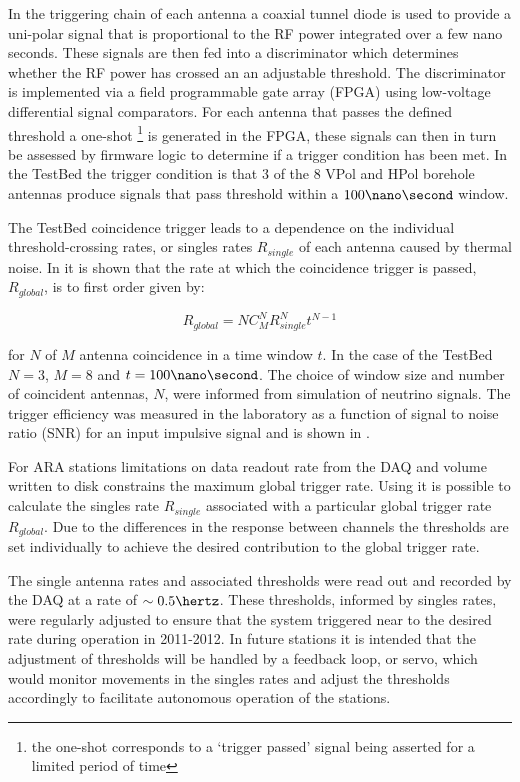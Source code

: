 In the triggering chain of each antenna a coaxial tunnel diode is used to provide a uni-polar signal that is proportional to the RF power integrated over a few nano seconds. These signals are then fed into a discriminator which determines whether the RF power has crossed an an adjustable threshold. The discriminator is implemented via a field programmable gate array (FPGA) using low-voltage differential signal comparators. For each antenna that passes the defined threshold a one-shot \footnote{the one-shot corresponds to a `trigger passed' signal being asserted for a limited period of time} is generated in the FPGA, these signals can then in turn be assessed by firmware logic to determine if a trigger condition has been met. In the TestBed the trigger condition is that 3 of the 8 VPol and HPol borehole antennas produce signals that pass threshold within a $100 \nano\second$ window. 

The TestBed coincidence trigger leads to a dependence on the individual threshold-crossing rates, or singles rates $R_{single}$ of each antenna caused by thermal noise. In  it is shown that the rate at which the coincidence trigger is passed, $R_{global}$, is to first order given by:

\begin{equation}
  R_{global} = N C^{N}_{M}R_{single}^{N}t^{N-1}
  \label{eq:ara-detector:TestBed:Trigger-Rate}
\end{equation}

\noindent for $N$ of $M$ antenna coincidence in a time window $t$. In the case of the TestBed $N=3$, $M=8$ and $t=100\nano\second$. The choice of window size and number of coincident antennas, $N$, were informed from simulation of neutrino signals. The trigger efficiency was measured in the laboratory as a function of signal to noise ratio (SNR) for an input impulsive signal and is shown in .

For ARA stations limitations on data readout rate from the DAQ and volume written to disk constrains the maximum global trigger rate. Using  it is possible to calculate the singles rate $R_{single}$ associated with a particular global trigger rate $R_{global}$. Due to the differences in the response between channels the thresholds are set individually to achieve the desired contribution to the global trigger rate.

The single antenna rates and associated thresholds were read out and recorded by the DAQ at a rate of $\sim 0.5 \hertz$. These thresholds, informed by singles rates, were regularly adjusted to ensure that the system triggered near to the desired rate during operation in 2011-2012. In future stations it is intended that the adjustment of thresholds will be handled by a feedback loop, or servo, which would monitor movements in the singles rates and adjust the thresholds accordingly to facilitate autonomous operation of the stations.

